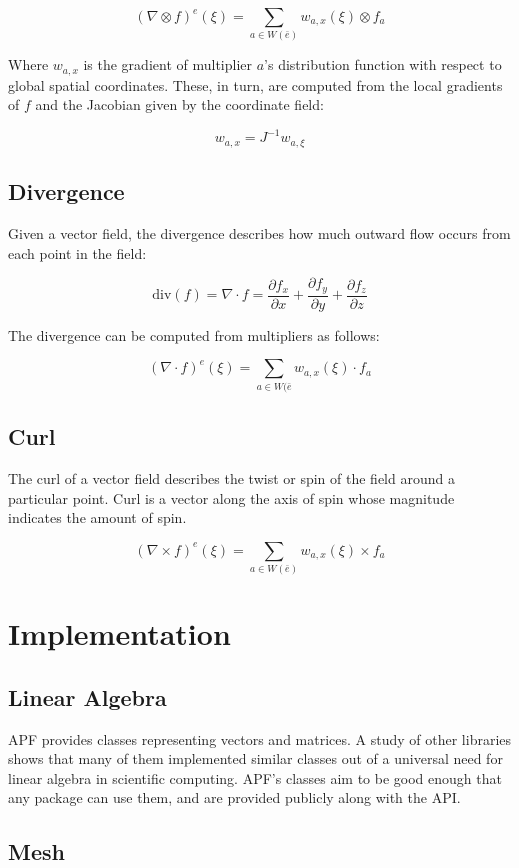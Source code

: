 \documentclass{article}
\begin{document}
\[(\nabla \otimes f)^e(\xi) = \sum_{a\in W(\bar{e})} w_{a,x}(\xi) \otimes f_a\]

Where $w_{a,x}$ is the gradient of multiplier $a$'s distribution function with respect
to global spatial coordinates.
These, in turn, are computed from the local gradients of $f$ and the Jacobian
given by the coordinate field:

\[w_{a,x} = J^{-1}w_{a,\xi}\]

\subsection{Divergence}

Given a vector field, the divergence describes how much outward
flow occurs from each point in the field:

\[\text{div}(f) = \nabla \cdot f =
\frac{\partial f_x}{\partial x} +
\frac{\partial f_y}{\partial y} +
\frac{\partial f_z}{\partial z}\]

The divergence can be computed from multipliers as follows:

\[(\nabla \cdot f)^e(\xi) = \sum_{a\in W(\bar{e}} w_{a,x}(\xi) \cdot f_a\]

\subsection{Curl}

The curl of a vector field describes the twist or spin of the field around
a particular point.
Curl is a vector along the axis of spin whose magnitude indicates the
amount of spin.

\[(\nabla \times f)^e(\xi) =
\sum_{a\in W(\bar{e})} w_{a,x}(\xi) \times f_a\]

\section{Implementation}

\subsection{Linear Algebra}

APF provides classes representing vectors and matrices.
A study of other libraries shows that many of them implemented similar classes
out of a universal need for linear algebra in scientific computing.
APF's classes aim to be good enough that any package can use them,
and are provided publicly along with the API.

\subsection{Mesh}
\end{document}
